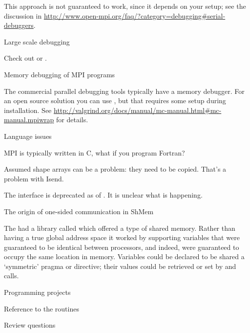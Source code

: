 This approach is not guaranteed to work, since it depends on
your  setup; see the discussion
in \url{http://www.open-mpi.org/faq/?category=debugging#serial-debuggers}.

 {Large scale debugging}

Check out  or .

 {Memory debugging of MPI programs}

The commercial parallel debugging tools typically have a memory
debugger. For an open source solution you can
use , but that requires some setup during
installation. See \url{http://valgrind.org/docs/manual/mc-manual.html#mc-manual.mpiwrap}
for details.

 {Language issues}

MPI is typically written in C, what if you program Fortran?

Assumed shape arrays can be a problem: they need to be copied. 
That's a problem with Isend.

The  interface is deprecated as of .
It is unclear what is happening.

 {The origin of one-sided communication in ShMem}

The  had a library called 
which offered a type of shared memory. Rather than having a true
global address space it worked by supporting variables that were
guaranteed to be identical between processors, and indeed, were
guaranteed to occupy the same location in memory. Variables could be
declared to be shared a `symmetric' pragma or directive; their values
could be retrieved or set by  and  calls.

 {Programming projects}


 {Reference to the routines}



 {Review questions}

